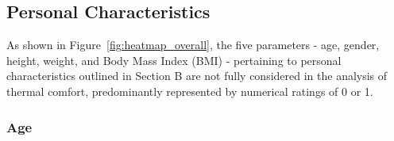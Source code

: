 \documentclass[final,3p,times,12pt]{elsarticle}
\begin{document}

\subsection{Personal Characteristics}
\label{subsec1}

As shown in Figure~\ref{fig:heatmap_overall}, the five parameters - age, gender, height, weight, and Body Mass Index (BMI) - pertaining to personal characteristics outlined in Section B are not fully considered in the analysis of thermal comfort, predominantly represented by numerical ratings of 0 or 1.

\subsubsection{Age}
\end{document}
